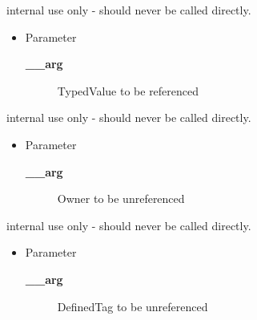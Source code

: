 \begin{desc}internal use only - should never be called directly.
\begin{itemize}
\item{Parameter
  \begin{description}
   \item[{\bf \_\_arg}]{TypedValue to be referenced}
  \end{description}}
\end{itemize}
\end{desc}

\begin{desc}internal use only - should never be called directly.
\begin{itemize}
\item{Parameter
  \begin{description}
   \item[{\bf \_\_arg}]{Owner to be unreferenced}
  \end{description}}
\end{itemize}
\end{desc}

\begin{desc}internal use only - should never be called directly.
\begin{itemize}
\item{Parameter
  \begin{description}
   \item[{\bf \_\_arg}]{DefinedTag to be unreferenced}
  \end{description}}
\end{itemize}
\end{desc}

